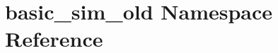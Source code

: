 \hypertarget{namespacebasic__sim__old}{\section{basic\-\_\-sim\-\_\-old Namespace Reference}
\label{namespacebasic__sim__old}
}
